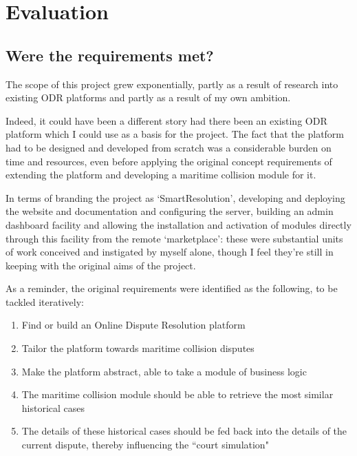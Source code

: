 \chapter{Evaluation}%

\section{Were the requirements met?}

The scope of this project grew exponentially, partly as a result of research into existing ODR platforms and partly as a result of my own ambition.

Indeed, it could have been a different story had there been an existing ODR platform which I could use as a basis for the project. The fact that the platform had to be designed and developed from scratch was a considerable burden on time and resources, even before applying the original concept requirements of extending the platform and developing a maritime collision module for it.

In terms of branding the project as `SmartResolution', developing and deploying the website and documentation and configuring the server, building an admin dashboard facility and allowing the installation and activation of modules directly through this facility from the remote `marketplace': these were substantial units of work conceived and instigated by myself alone, though I feel they're still in keeping with the original aims of the project.

As a reminder, the original requirements were identified as the following, to be tackled iteratively:

\begin{enumerate}

    \item Find or build an Online Dispute Resolution platform
    
    \item Tailor the platform towards maritime collision disputes

    \item Make the platform abstract, able to take a module of business logic
    
    \item The maritime collision module should be able to retrieve the most similar historical cases

    \item The details of these historical cases should be fed back into the details of the current dispute, thereby influencing the ``court simulation"

\end{enumerate}

